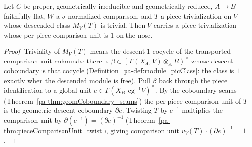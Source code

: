 \begin{theorem}
  \label{pa-thm:exists_pieceComparisonUnit_eq_one}
  \leanok

  Let \(C\) be proper, geometrically irreducible and geometrically reduced, \(A \to B\) faithfully
  flat, \(W\) a \(\sigma\)-normalized comparison, and \(T\) a piece trivialization on \(V\) whose
  descended class \(M_V(T)\) is trivial. Then \(V\) carries a piece trivialization whose per-piece
  comparison unit is \(1\) on the nose.
\end{theorem}
\begin{proof}
  \leanok
  Triviality of \(M_V(T)\) means the descent \(1\)-cocycle of the transported comparison unit
  cobounds: there is \(\beta \in (\Gamma(X_A, V) \otimes_A B)^{\times}\) whose descent coboundary is
  that cocycle (Definition~\ref{pa-def:module_picClass}: the class is \(1\) exactly when the descended
  module is free). Pull \(\beta\) back through the piece identification to a global unit \(e \in
  \Gamma(X_B, \mathrm{cg}^{-1}V)^{\times}\). By the coboundary seams
  (Theorem~\ref{pa-thm:geomCoboundary_seams}) the per-piece comparison unit of \(T\) is the geometric
  descent coboundary \(\partial e\). Twisting \(T\) by \(e^{-1}\) multiplies the comparison unit by
  \(\partial(e^{-1}) = (\partial e)^{-1}\) (Theorem~\ref{pa-thm:pieceComparisonUnit_twist}), giving
  comparison unit \(v_V(T) \cdot (\partial e)^{-1} = 1\).
\end{proof}

